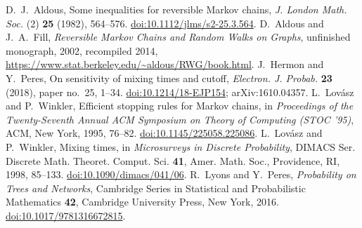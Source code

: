  D.~J.~Aldous, Some inequalities for reversible Markov chains, \emph{J. London Math. Soc.} (2)
\textbf{25} (1982), 564--576. \href{https://doi.org/10.1112/jlms/s2-25.3.564}{doi:10.1112/jlms/s2-25.3.564}.
 D.~Aldous and J.~A.~Fill, \emph{Reversible Markov Chains and Random Walks on Graphs}, unfinished
monograph, 2002, recompiled 2014, \url{https://www.stat.berkeley.edu/~aldous/RWG/book.html}.
 J.~Hermon and Y.~Peres, On sensitivity of mixing times and cutoff, \emph{Electron. J. Probab.}
\textbf{23} (2018), paper no.~25, 1--34. \href{https://doi.org/10.1214/18-EJP154}{doi:10.1214/18-EJP154};
arXiv:1610.04357.
 L.~Lov\'asz and P.~Winkler, Efficient stopping rules for Markov chains, in \emph{Proceedings of the
Twenty-Seventh Annual ACM Symposium on Theory of Computing (STOC '95)}, ACM, New York, 1995, 76--82.
\href{https://doi.org/10.1145/225058.225086}{doi:10.1145/225058.225086}.
 L.~Lov\'asz and P.~Winkler, Mixing times, in \emph{Microsurveys in Discrete Probability}, DIMACS Ser.
Discrete Math. Theoret. Comput. Sci. \textbf{41}, Amer. Math. Soc., Providence, RI, 1998, 85--133.
\href{https://doi.org/10.1090/dimacs/041/06}{doi:10.1090/dimacs/041/06}.
 R.~Lyons and Y.~Peres, \emph{Probability on Trees and Networks}, Cambridge Series in Statistical and
Probabilistic Mathematics \textbf{42}, Cambridge University Press, New York, 2016.
\href{https://doi.org/10.1017/9781316672815}{doi:10.1017/9781316672815}.
